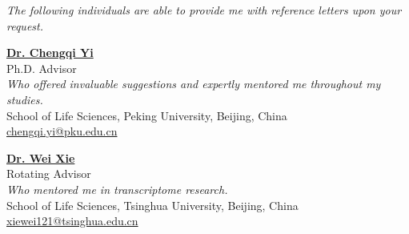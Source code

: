 \textit{The following individuals are able to provide me with reference letters upon your request.}
\vspace{4pt}

\textbf{\href{https://www.bio.pku.edu.cn/enhomes/news/teacher_dis/91.html}{Dr. Chengqi Yi}}\\
Ph.D. Advisor \\
\textit{Who offered invaluable suggestions and expertly mentored me throughout my studies.}\\
School of Life Sciences, Peking University, Beijing, China\\
\href{mailto:chengqi.yi@pku.edu.cn}{chengqi.yi@pku.edu.cn}\\





\vspace{4pt}

\textbf{\href{https://life.tsinghua.edu.cn/lifeen/info/1034/1077.htm}{Dr. Wei Xie}}\\
Rotating Advisor\\
\textit{Who mentored me in transcriptome research.}\\
School of Life Sciences, Tsinghua University, Beijing, China\\
\href{mailto:xiewei121@tsinghua.edu.cn}{xiewei121@tsinghua.edu.cn}\\


